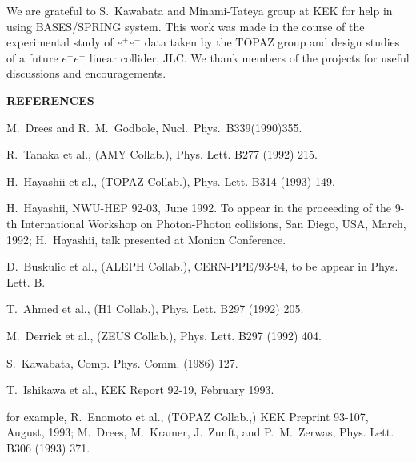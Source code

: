 \vskip 1cm
We are grateful to S.~Kawabata and Minami-Tateya group at KEK for
help in using BASES/SPRING system.
This work was made in the course of the experimental study of $e^+e^-$
data taken by the TOPAZ group and design studies of a future $e^+e^-$
linear collider, JLC.  
We thank members of the projects for useful discussions and encouragements.



\vskip 1cm
\begin{center}
\bf REFERENCES
\end{center}

%
%
\begin{thebibliography}{99}


% 
M.~Drees and R.~M.~Godbole, Nucl.~Phys.~B339(1990)355.

%
%
R.~Tanaka {\elevenit  et al.}, (AMY Collab.),
{\elevenit Phys. Lett.} {\elevenbf B277} (1992) 215.

%
H.~Hayashii {\elevenit et al.}, (TOPAZ Collab.), 
{\elevenit Phys. Lett.} {\elevenbf B314} (1993) 149.

%
H.~Hayashii, NWU-HEP 92-03, June 1992. To appear in the proceeding
of the 9-th International Workshop on Photon-Photon collisions,
San Diego, USA, March, 1992;
H.~Hayashii, talk presented at Monion Conference.
%
	
%
%
D.~Buskulic {\elevenit et al.}, (ALEPH Collab.),
{\elevenit CERN-PPE/93-94}, {\elevenit to be appear in Phys. Lett. B}.

%
%
T.~Ahmed {\elevenit et al.}, (H1 Collab.),
{\elevenit Phys. Lett.} {\elevenbf B297} (1992) 205.

%
M.~Derrick {\elevenit et al.}, (ZEUS Collab.),
{\elevenit Phys. Lett.} {\elevenbf B297} (1992) 404.

S.~Kawabata, {\elevenit Comp. Phys. Comm.}
{} (1986) 127.

T.~Ishikawa {\elevenit  et al.}, {\elevenit KEK Report 92-19},
February 1993.

for example,
R.~Enomoto {\elevenit et al.}, (TOPAZ Collab.,)
{\elevenit KEK Preprint 93-107}, August, 1993;
M.~Drees, M.~Kramer, J.~Zunft, and P.~M.~Zerwas,
{\elevenit Phys. Lett. } {\elevenbf B306} (1993) 371.


\end{thebibliography}
